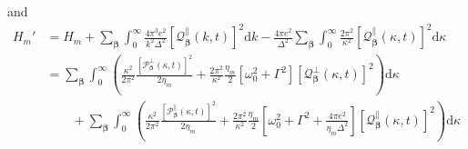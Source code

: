 \documentclass{article}
\begin{document}
and
\begin{equation}
\begin{split}
H_m' &= H_m + \sum_{\bm{\beta}}\int_0^\infty\frac{4\pi^3e^2}{k^2\Delta^2}\left[\mathcal{Q}_{\bm{\beta}}^\parallel(k,t)\right]^2\mathrm{d}k - \frac{4\pi e^2}{\Delta^2}\sum_{\bm{\beta}}\int_0^\infty\frac{2\pi^2}{\kappa^2}\left[\mathcal{Q}_{\bm{\beta}}^\parallel(\kappa,t)\right]^2\mathrm{d}\kappa\\
&= \sum_{\bm{\beta}}\int_0^\infty\left(\frac{\kappa^2}{2\pi^2}\frac{\left[\mathcal{P}_{\bm{\beta}}^\perp(\kappa,t)\right]^2}{2\eta_m} + \frac{2\pi^2}{\kappa^2}\frac{\eta_m}{2}\left[\omega_0^2 + \Gamma^2\right]\left[\mathcal{Q}_{\bm{\beta}}^\perp(\kappa,t)\right]^2\right)\mathrm{d}\kappa\\
&\qquad + \sum_{\bm{\beta}}\int_0^\infty\left(\frac{\kappa^2}{2\pi^2}\frac{\left[\mathcal{P}_{\bm{\beta}}^\parallel(\kappa,t)\right]^2}{2\eta_m} + \frac{2\pi^2}{\kappa^2}\frac{\eta_m}{2}\left[\omega_0^2 + \Gamma^2 + \frac{4\pi e^2}{\eta_m\Delta^2}\right]\left[\mathcal{Q}_{\bm{\beta}}^\parallel(\kappa,t)\right]^2\right)\mathrm{d}\kappa
\end{split}
\end{equation}
\end{document}
